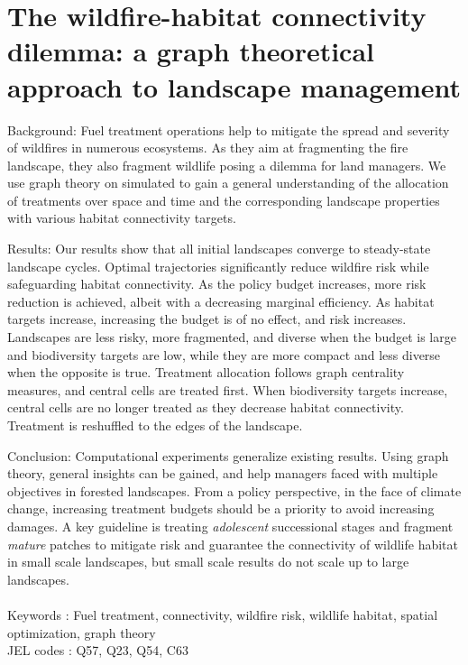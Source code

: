 \chapter{The wildfire-habitat connectivity dilemma: a graph theoretical approach to landscape management}
\label{chapter2}
\begin{center}
\begin{minipage}{0.9\textwidth}
	\singlespacing
Background: Fuel treatment operations help to mitigate the spread and severity of wildfires in numerous ecosystems. As they aim at fragmenting the fire landscape, they also fragment wildlife posing a dilemma for land managers. We use graph theory on simulated to gain a general understanding of the allocation of treatments over space and time and the corresponding landscape properties with various habitat connectivity targets. 
 
Results: Our results show that all initial landscapes converge to steady-state landscape cycles. Optimal trajectories significantly reduce wildfire risk while safeguarding habitat connectivity. As the policy budget increases, more risk reduction is achieved, albeit with a decreasing marginal efficiency. As habitat targets increase, increasing the budget is of no effect, and risk increases. Landscapes are less risky, more fragmented, and diverse when the budget is large and biodiversity targets are low, while they are more compact and less diverse when the opposite is true. Treatment allocation follows graph centrality measures, and central cells are treated first. When biodiversity targets increase, central cells are no longer treated as they decrease habitat connectivity. Treatment is reshuffled to the edges of the landscape.


Conclusion: Computational experiments generalize existing results. Using graph theory, general insights can be gained, and help managers faced with multiple objectives in forested landscapes. From a policy perspective, in the face of climate change, increasing treatment budgets should be a priority to avoid increasing damages. A key guideline is treating \textit{adolescent} successional stages and fragment \textit{mature} patches to mitigate risk and guarantee the connectivity of wildlife habitat in small scale landscapes, but small scale results do not scale up to large landscapes. 
\\\\
Keywords : Fuel treatment, connectivity, wildfire risk, wildlife habitat, spatial optimization, graph theory\\
JEL codes : Q57, Q23, Q54, C63
\end{minipage}
\end{center}

